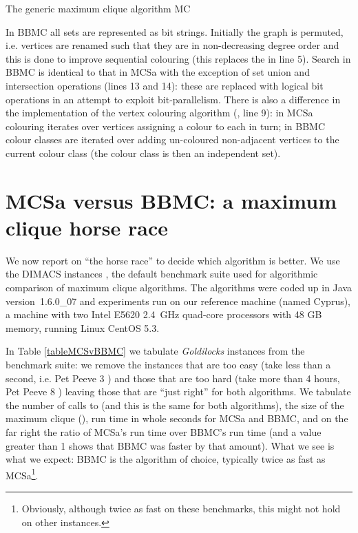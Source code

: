 \documentclass[runningheads]{llncs}
\begin{document}
\begin{algorithm}
\DontPrintSemicolon
\nl  \;
\nl \Begin{
\nl  \;
\nl  \;
\nl  \;
\nl  \;
}
\;
\nl  \;
\nl {}
\caption{The generic maximum clique algorithm MC}
\label{mc}
\end{algorithm}



In BBMC all sets are represented as bit strings. Initially the graph is permuted, i.e. vertices are renamed such that they are in 
non-decreasing degree order and this is done to improve sequential colouring (this replaces the  in line 5). 
Search in BBMC is identical to that in MCSa with the exception of  set union and intersection operations (lines 13 and 14): these are 
replaced with logical bit operations in an attempt to exploit bit-parallelism. There is also a 
difference in the implementation of the vertex colouring algorithm (, line 9): in MCSa colouring iterates over vertices assigning 
a colour to each in turn; in BBMC colour classes are iterated over adding un-coloured non-adjacent vertices to the current colour class
(the colour class is then an independent set).

\section{MCSa versus BBMC: a maximum clique horse race}
\vspace{-1.5mm}
We now report on ``the horse race'' to decide which algorithm is better. We use the DIMACS instances \cite{DIMACS},
the default benchmark suite used for algorithmic comparison of maximum clique algorithms.
The algorithms were coded up in Java \mbox{version 1.6.0\_07} and experiments run on our reference machine (named Cyprus), 
a machine with two Intel E5620 2.4~GHz quad-core processors with 48 GB memory, running Linux CentOS 5.3.

In Table \ref{tableMCSvBBMC} we tabulate \emph{Goldilocks} instances from the benchmark suite: we remove the instances that are too
easy (take less than a second, i.e. Pet Peeve 3 \cite{howTo}) and those that are too hard (take more than 4 hours, Pet Peeve 8 \cite{howTo}) 
leaving those that are ``just right'' for both algorithms. We tabulate the number of calls to  (and this is the same for 
both algorithms), the size of the maximum clique 
(), run time in whole seconds for MCSa and BBMC, and on the far right the ratio of MCSa's run time over BBMC's run time
(and a value greater than 1 shows that BBMC was faster by that amount). What we see is what we expect: BBMC is the algorithm of 
choice, typically twice as fast as MCSa\footnote{Obviously, although twice as fast on these benchmarks, this might not hold on
other instances.}.
\end{document}
